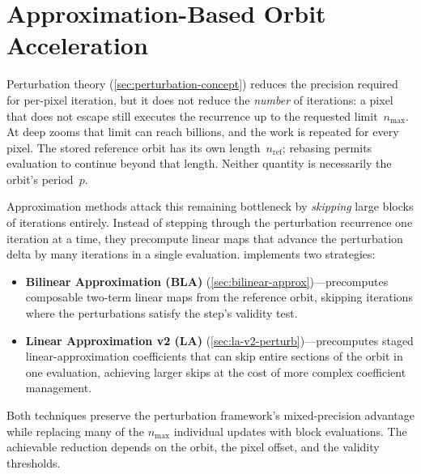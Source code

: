 
\section{Approximation-Based Orbit Acceleration}
\label{sec:approx-accel}

Perturbation theory (\cref{sec:perturbation-concept}) reduces the
precision required for per-pixel iteration, but it does not reduce the
\emph{number} of iterations: a pixel that does not escape still executes
the recurrence up to the requested limit~$n_{\max}$. At deep zooms that
limit can reach billions, and the work is repeated for every pixel.
The stored reference orbit has its own length~$n_{\mathrm{ref}}$;
rebasing permits evaluation to continue beyond that length. Neither
quantity is necessarily the orbit's period~$p$.

Approximation methods attack this remaining bottleneck by \emph{skipping}
large blocks of iterations entirely.  Instead of stepping through the
perturbation recurrence one iteration at a time, they precompute linear
maps that advance the perturbation delta by many iterations in a single
evaluation. \FractalShark{} implements two strategies:
\begin{itemize}
\item \textbf{Bilinear Approximation (BLA)}
  (\cref{sec:bilinear-approx})---precomputes composable two-term linear
  maps from the reference orbit, skipping iterations where the
  perturbations satisfy the step's validity test.
\item \textbf{Linear Approximation v2 (LA)}
  (\cref{sec:la-v2-perturb})---precomputes staged linear-approximation
  coefficients that can skip entire sections of the orbit in one
  evaluation, achieving larger skips at the cost of more complex
  coefficient management.
\end{itemize}
Both techniques preserve the perturbation framework's mixed-precision
advantage while replacing many of the $n_{\max}$ individual updates
with block evaluations. The achievable reduction depends on the orbit,
the pixel offset, and the validity thresholds.


